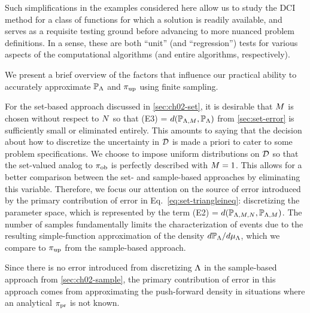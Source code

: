 Such simplifications in the examples considered here allow us to study the DCI method for a class of functions for which a solution is readily available, and serves as a requisite testing ground before advancing to more nuanced problem definitions.
In a sense, these are both ``unit'' (and ``regression'') tests for various aspects of the computational algorithms (and entire algorithms, respectively).

We present a brief overview of the factors that influence our practical ability to accurately approximate $\mathbb{P}_{\Lambda}$ and $\operatorname*{\pi_{up}}$ using finite sampling.

For the set-based approach discussed in \ref{sec:ch02-set}, it is desirable that $M$ is chosen without respect to $N$ so that (E3) = $d(\mathbb{P}_{{\Lambda}, M}, \mathbb{P}_{\Lambda})$ from \ref{sec:set-error} is sufficiently small or eliminated entirely.
This amounts to saying that the decision about how to discretize the uncertainty in $\mathcal{D}$ is made a priori to cater to some problem specifications.
We choose to impose uniform distributions on $\mathcal{D}$ so that the set-valued analog to $\operatorname*{\pi_{ob}}$ is perfectly described with $M=1$.
This allows for a better comparison between the set- and sample-based approaches by eliminating this variable. 
Therefore, we focus our attention on the source of error introduced by the primary contribution of error in Eq.~\eqref{eq:set-triangleineq}:  discretizing the parameter space, which is represented by the term (E2) = $d(\mathbb{P}_{{\Lambda}, M, N}, \mathbb{P}_{{\Lambda}, M})$.
The number of samples fundamentally limits the characterization of events due to the resulting simple-function approximation of the density $d\mathbb{P}_{\Lambda} / d\mu_{{\Lambda}}$, which we compare to $\operatorname*{\pi_{up}}$ from the sample-based approach.

Since there is no error introduced from discretizing ${\Lambda}$ in the sample-based approach from \ref{sec:ch02-sample}, the primary contribution of error in this approach comes from approximating the push-forward density in situations where an analytical $\operatorname*{\pi_{pr}}$ is not known.




